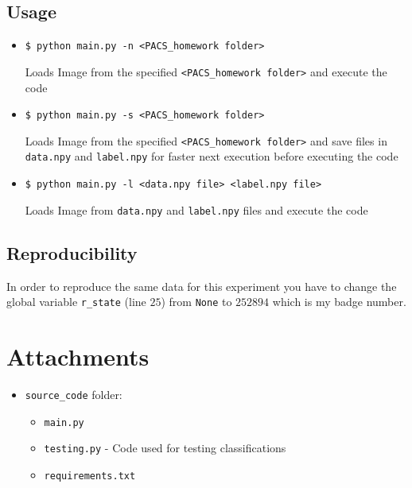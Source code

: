\documentclass[a4paper, 11pt]{article}
\begin{document}
	\subsection{Usage}
	\begin{itemize}
		\item \texttt{\$ python main.py -n <PACS\_homework folder>}
		
		Loads Image from the specified \texttt{<PACS\_homework folder>} and execute the code
		
		\item \texttt{\$ python main.py -s <PACS\_homework folder>}
		
		Loads Image from the specified \texttt{<PACS\_homework folder>} and save files in \texttt{data.npy} and \texttt{label.npy} for faster next execution before executing the code
		
		\item \texttt{\$ python main.py -l <data.npy file> <label.npy file> }
		
		Loads Image from \texttt{data.npy} and \texttt{label.npy} files and execute the code
	
	\end{itemize}
	\subsection{Reproducibility}
	In order to reproduce the same data for this experiment you have to change the global variable \texttt{r\_state} (line $25$) from \texttt{None} to $252894$ which is my badge number.

	\section*{Attachments}
	\begin{itemize}
		\item \texttt{source\_code} folder:
		\begin{itemize}
			\item \texttt{main.py}
			\item \texttt{testing.py} - Code used for testing classifications
			\item \texttt{requirements.txt}
		\end{itemize}
	\end{itemize}
	
	
	
	
\end{document}
